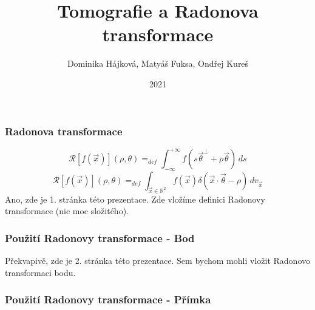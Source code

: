 \documentclass{beamer}
\title{Tomografie a Radonova transformace}
\author{Dominika Hájková, Matyáš Fuksa, Ondřej Kureš}
\institute{Skupina W}
\date{2021}
\begin{document}
\frame{\titlepage}

\begin{frame}
\frametitle{Radonova transformace}
\begin{equation}
\mathcal{R}[f(\vec{x})](\rho, \theta)=_{def} \int_{-\infty}^{+\infty}f(s \vec{\theta}^\perp + \rho \vec{\theta}) \,ds
\end{equation}
\begin{equation}
\mathcal{R}[f(\vec{x})](\rho, \theta)=_{def} \int_{\vec{x}\in \mathbb{R}^2}f(\vec{x})\delta \left(\vec{x}\cdot\vec{\theta} - \rho\right) \,dv_{\vec{x}} 
\end{equation}
Ano, zde je 1. stránka této prezentace. Zde vložíme definici Radonovy transformace (nic moc složitého).
\end{frame}
\begin{frame}
\frametitle{Použití Radonovy transformace - Bod}
Překvapivě, zde je 2. stránka této prezentace. Sem bychom mohli vložit Radonovo transformaci bodu.
\end{frame}
\begin{frame}
\frametitle{Použití Radonovy transformace - Přímka}
\begin{figure}
\begin{columns}
	 \label{fig:sub3}
\end{columns}
\end{figure}
\end{frame}
\end{document}
